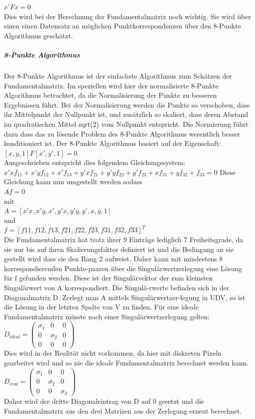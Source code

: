$x'Fx = 0$
\\
Dies wird bei der Berechnung der Fundamentalmatrix noch wichtig. Sie wird über einen einen Datensatz an möglichen Punktkorrespondenzen über den 8-Punkte Algorithmus geschätzt.

\subparagraph{8-Punkte Algorithmus}
Der 8-Punkte Algorithmus ist der einfachste Algorithmus zum Schätzen der Fundamentalmatrix. Im speziellen wird hier der normalisierte 8-Punkte Algorithmus betrachtet, da die Normalisierung der Punkte zu besseren Ergebnissen führt.
Bei der Normalisierung werden die Punkte so verschoben, dass ihr Mittelpunkt der Nullpunkt ist, und zusätzlich so skaliert, dass deren Abstand im quadratischen Mittel sqrt(2) vom Nullpunkt entspricht. Die Normierung führt dazu dass das zu lösende Problem des 8-Punkte Algorithmus wesentlich besser konditioniert ist.
Der 8-Punkte Algorithmus basiert auf der Eigenschaft:
\\
$[x,y,1] F [x',y',1] = 0$
\\
Ausgeschrieben entspricht dies folgendem Gleichungssystem:
\\
$x'xf_{11} + x'yf_{12}  + x'f_{13} + y'xf_{21} + y'yf_{22} + y'f_{23} + xf_{31} + yf_{32} + f_{33} = 0$
Diese Gleichung kann nun umgestellt werden sodass
\\
$Af = 0$
\\
mit
\\
$A = [x'x, x'y, x', y'x, y'y, y', x,y,1]$
\\
und
\\
$f = [f11,f12,f13,f21,f22,f23,f31,f32,f33]^T$
\\
Die Fundamentalmatrix hat trotz ihrer 9 Einträge lediglich 7 Freiheitsgrade, da sie nur bis auf ihren Skalierungsfaktor definiert ist und die Bedingung an sie gestellt wird dass sie den Rang 2 aufweist. Daher kann mit mindestens 8 korrespondierenden Punkte-paaren über die Singulärwertzerlegung eine Lösung für f gefunden werden. Diese ist der Singulärvektor der zum kleinsten Singulärwert von A korrespondiert. Die Singulä-rwerte befinden sich in der Diagonalmatrix D. Zerlegt man A mittels Singulärwertzer-legung in UDV, so ist die Lösung in der letzten Spalte von V zu finden.
Für eine ideale Fundamentalmatrix müsste nach einer Singulärwertzerlegung gelten:
\\
$D_{ideal} = \begin{pmatrix} \sigma_1 & 0 & 0\\0 & \sigma_2 & 0 \\0 & 0 & 0 \end{pmatrix}$
\\
Dies wird in der Realität nicht vorkommen, da hier mit diskreten Pixeln gearbeitet wird und so nie die ideale Fundamentalmatrix berechnet werden kann.
\\
$D_{real} = \begin{pmatrix} \sigma_1 & 0 & 0\\0 & \sigma_2 & 0 \\0 & 0 & \sigma_3 \end{pmatrix}$
\\
Daher wird der dritte Diagonaleintrag von D auf 0 gesetzt und die Fundamentalmatrix aus den drei Matrizen aus der Zerlegung erneut berechnet.


